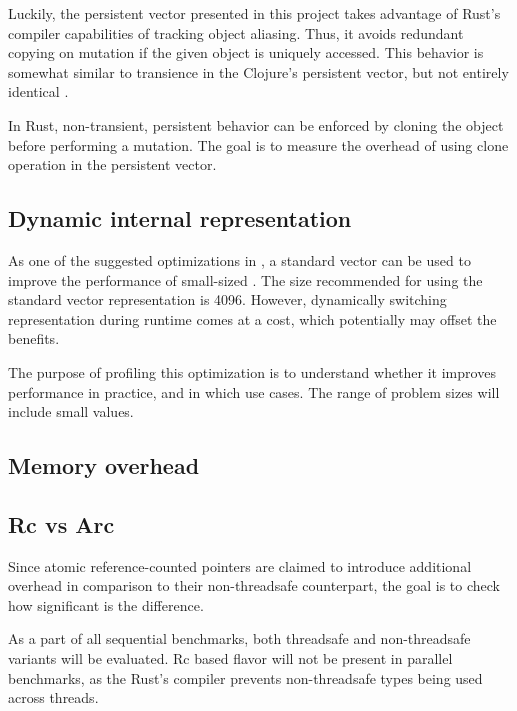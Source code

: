 Luckily, the persistent vector presented in this project takes advantage of Rust's compiler capabilities of tracking object aliasing. Thus, it avoids redundant copying on mutation if the given object is uniquely accessed. This behavior is somewhat similar to transience in the Clojure's persistent vector, but not entirely identical . 

In Rust, non-transient, persistent behavior can be enforced by cloning the object before performing a mutation. The goal is to measure the overhead of using clone operation in the persistent vector. 

\subsection{Dynamic internal representation}
As one of the suggested optimizations in , a standard vector can be used to improve the performance of small-sized \rrbvec{}. The size recommended for using the standard vector representation is 4096. However, dynamically switching representation during runtime comes at a cost, which potentially may offset the benefits. 

The purpose of profiling this optimization is to understand whether it improves performance in practice, and in which use cases. The range of problem sizes will include small values. 


\subsection{Memory overhead}

\subsection{Rc vs Arc}
Since atomic reference-counted pointers are claimed to introduce additional overhead in comparison to their non-threadsafe counterpart, the goal is to check how significant is the difference. 

As a part of all sequential benchmarks, both threadsafe and non-threadsafe variants will be evaluated. Rc based flavor will not be present in parallel benchmarks, as the Rust's compiler prevents non-threadsafe types being used across threads. 

